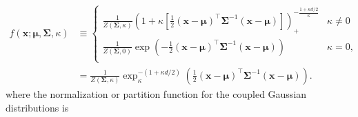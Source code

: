 \documentclass[twoside,11pt]{article}
\begin{document}
\begin{align}
    f\left(\mathbf{x};\boldsymbol{\mu},\boldsymbol{\Sigma},\kappa\right)
    &\equiv
    \left\{
    \begin{matrix}
    \frac{1}{Z\left(\boldsymbol{\Sigma},\kappa\right)}
    \left(
    1+\kappa
    \left[
    \frac12
    \left(\mathbf{x}-\boldsymbol{\mu}\right)^{\intercal}
    \boldsymbol{\Sigma}^{-1}
    \left(\mathbf{x}-\boldsymbol{\mu}\right)
    \right]
    \right)_+^{-\frac{1+\kappa d/2}{\kappa}}
    &\kappa\neq0
    \\
    \frac{1}{Z\left(\boldsymbol{\Sigma},0\right)}
    \exp\left(
    -\frac12
    \left(\mathbf{x}-\boldsymbol{\mu}\right)^{\intercal}
    \boldsymbol{\Sigma}^{-1}
    \left(\mathbf{x}-\boldsymbol{\mu}\right)
    \right)
    &\kappa=0,
    \\
    \end{matrix}
    \right.
    \\
    &=
    \frac{1}{Z\left(\boldsymbol{\Sigma},\kappa\right)}
    \exp_{\kappa}^{-(1+\kappa d/2)}
    \left(
    \frac12
    \left(\mathbf{x}-\boldsymbol{\mu}\right)^{\intercal}
    \boldsymbol{\Sigma}^{-1}
    \left(\mathbf{x}-\boldsymbol{\mu}\right)
    \right).
\end{align} 
where the normalization or partition function for the coupled Gaussian distributions is
\end{document}
